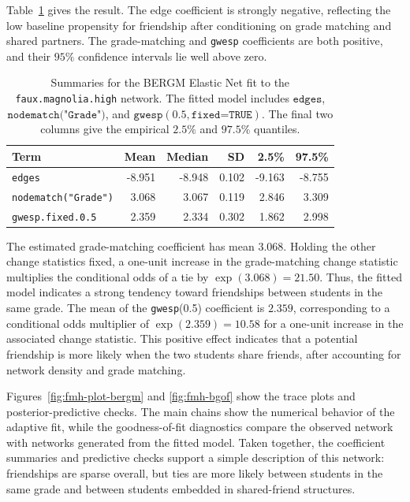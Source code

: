 \documentclass[preprint,12pt,authoryear]{elsarticle}
\begin{document}
Table~\ref{tab:fmh-elastic-net-posterior} gives the result.
The edge coefficient is strongly negative, reflecting the low baseline
propensity for friendship after conditioning on grade matching and shared
partners. The grade-matching and \texttt{gwesp} coefficients are both positive,
and their \(95\%\) confidence intervals lie well above zero.

\begin{table}[H]
\centering
\caption{Summaries for the BERGM Elastic Net fit to the
\texttt{faux.magnolia.high} network. The fitted model includes
\(\texttt{edges}\), \(\texttt{nodematch("Grade")}\), and
\(\texttt{gwesp}(0.5,\texttt{fixed=TRUE})\). The final two columns give the
empirical \(2.5\%\) and \(97.5\%\) quantiles.}
\label{tab:fmh-elastic-net-posterior}
\begin{tabular}{lrrrrr}
\toprule
Term & Mean & Median & SD & 2.5\% & 97.5\% \\
\midrule
\texttt{edges}
& -8.951 & -8.948 & 0.102 & -9.163 & -8.755 \\
\texttt{nodematch("Grade")}
& 3.068 & 3.067 & 0.119 & 2.846 & 3.309 \\
\texttt{gwesp.fixed.0.5}
& 2.359 & 2.334 & 0.302 & 1.862 & 2.998 \\
\bottomrule
\end{tabular}
\end{table}

The estimated grade-matching coefficient has mean \(3.068\).
Holding the other change statistics fixed, a one-unit increase in the
grade-matching change statistic multiplies the conditional odds of a tie by
$
\exp(3.068)=21.50.
$
Thus, the fitted model indicates a strong tendency toward friendships between
students in the same grade. The mean of the
\texttt{gwesp}(0.5) coefficient is \(2.359\), corresponding to a conditional
odds multiplier of
$
\exp(2.359)=10.58
$
for a one-unit increase in the associated change statistic. This positive
effect indicates that a potential friendship is more likely when the two
students share friends, after accounting for network density and grade
matching.

Figures~\ref{fig:fmh-plot-bergm} and \ref{fig:fmh-bgof} show the trace plots
and posterior-predictive checks. The main chains show the numerical
behavior of the adaptive fit, while the goodness-of-fit diagnostics compare
the observed network with networks generated from the fitted model. Taken
together, the coefficient summaries and predictive checks support a simple
description of this network: friendships are sparse overall, but ties are more
likely between students in the same grade and between students embedded in
shared-friend structures.
\end{document}
